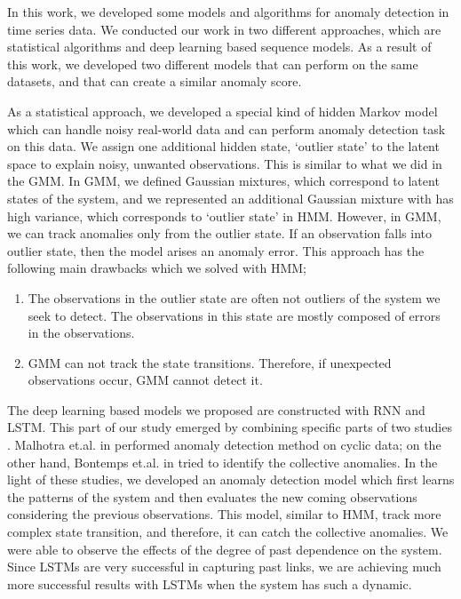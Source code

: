 In this work, we developed some models and algorithms for anomaly detection in time series data.
We conducted our work in two different approaches, which are statistical algorithms and deep learning based sequence models. As a result of this work, we developed two different models that can perform on the same datasets, and that can create a similar anomaly score.

As a statistical approach, we developed a special kind of hidden Markov model which can handle noisy real-world data and can perform anomaly detection task on this data. We assign one additional hidden state, `outlier state' to the latent space to explain noisy, unwanted observations. This is similar to what we did in the GMM. In GMM, we defined Gaussian mixtures, which correspond to latent states of the system, and we represented an additional Gaussian mixture with has high variance, which corresponds to `outlier state' in HMM. However, in GMM, we can track anomalies only from the outlier state. If an observation falls into outlier state, then the model arises an anomaly error. This approach has the following  main drawbacks which we solved with HMM;

\begin{enumerate}
    \item The observations in the outlier state are often not outliers of the system we seek to detect. The observations in this state are mostly composed of errors in the observations.
    \item GMM can not track the state transitions. Therefore, if unexpected observations occur, GMM cannot detect it.
\end{enumerate}

The deep learning based models we proposed are constructed with RNN and LSTM.
This part of our study emerged by combining specific parts of two studies \cite{malhotra2015long,bontemps2016collective}. Malhotra et.al. in \cite{malhotra2015long} performed anomaly detection method on cyclic data; on the other hand, Bontemps et.al. in \cite{bontemps2016collective} tried to identify the collective anomalies. 
In the light of these studies, we developed an anomaly detection model which first learns the patterns of the system and then evaluates the new coming observations considering the previous observations. 
This model, similar to HMM, track more complex state transition, and therefore, it can catch the collective anomalies.
We were able to observe the effects of the degree of past dependence on the system.
Since LSTMs are very successful in capturing past links, we are achieving much more successful results with LSTMs when the system has such a dynamic.

